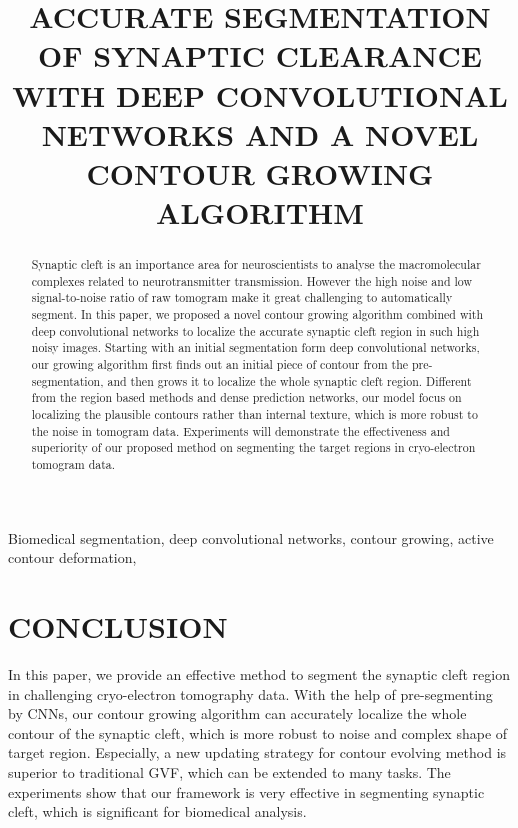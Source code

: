 \documentclass{article}
\begin{document}
\sloppy

\def\x{{\mathbf x}}
\def\L{{\cal L}}


\title{ACCURATE SEGMENTATION OF SYNAPTIC CLEARANCE WITH DEEP CONVOLUTIONAL NETWORKS AND A NOVEL CONTOUR GROWING ALGORITHM}
%
\address{}


\maketitle


%
\begin{abstract}
Synaptic cleft is an importance area for neuroscientists to analyse the macromolecular complexes related to neurotransmitter transmission.
However the high noise and low signal-to-noise ratio of raw tomogram make it great challenging to automatically segment.
In this paper, we proposed a novel contour growing algorithm combined with deep convolutional networks to localize the accurate synaptic cleft region in such high noisy images.
Starting with an initial segmentation form deep convolutional networks, our growing algorithm first finds out an initial piece of contour from the pre-segmentation, and then grows it to localize the whole synaptic cleft region.
Different from the region based methods and dense prediction networks, our model focus on localizing the plausible contours rather than internal texture, which is more robust to the noise in tomogram data.
Experiments will demonstrate the effectiveness and superiority of our proposed method on segmenting the target regions in cryo-electron tomogram data.
\end{abstract}
%
\begin{keywords}
Biomedical segmentation, deep convolutional networks, contour growing, active contour deformation,
\end{keywords}
%


\section{CONCLUSION}
\label{sec:conclusion}
In this paper, we provide an effective method to segment the synaptic cleft region in challenging cryo-electron tomography data.
With the help of pre-segmenting by CNNs, our contour growing algorithm can accurately localize the whole contour of the synaptic cleft, which is more robust to noise and complex shape of target region.
Especially, a new updating strategy for contour evolving method is superior to traditional GVF, which can be extended to many tasks.
The experiments show that our framework is very effective in segmenting synaptic cleft, which is significant for biomedical analysis.

%
%


\end{document}
